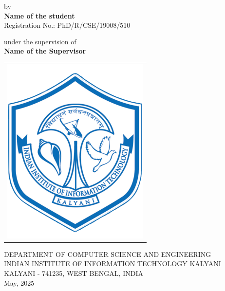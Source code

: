 \vspace{-0.2cm}
\begin{center}
 \begin{large}
 by\\
 \vspace{0.2cm}
 \textbf{Name of the student}\\
 \vspace{0.1cm}
 Registration No.: PhD/R/CSE/19008/510\\
 \end{large}
\end{center}

\vspace{0.1cm}
\begin{center}
 \begin{large}
 under the supervision of\\
 \vspace{.2cm}
 \textbf {Name of the Supervisor}\\
 \vspace{.2cm}
 \end{large}
\end{center}
\begin{center}
 \begin{tabular}{l}
 \includegraphics[width = 3.5 cm]{Figure/header/IIITK.png}
 \end{tabular}
\end{center}
\vspace{-0.3cm}
\begin{center}
\begin{large}
  \vspace{0.15cm}
  \hspace{-15mm} DEPARTMENT OF COMPUTER SCIENCE AND ENGINEERING\\
  \hspace{-15mm} INDIAN INSTITUTE OF INFORMATION TECHNOLOGY KALYANI\\
   KALYANI - 741235, WEST BENGAL, INDIA\\
   \vskip 50pt
   May, 2025
\end{large}
\end{center}

